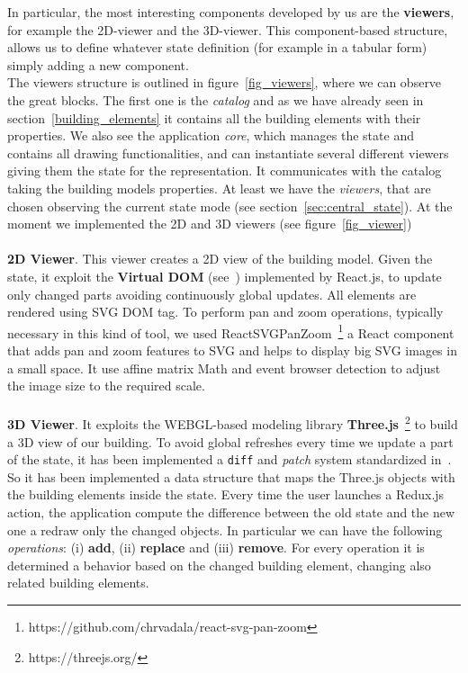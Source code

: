 In particular, the most interesting components developed by us are the \textbf{viewers}, for example the 2D-viewer and the 3D-viewer. This component-based structure, allows us to define whatever state definition (for example in a tabular form) simply adding a new component.\\

The viewers structure is outlined in figure~\ref{fig_viewers}, where we can observe the great blocks. The first one is the \textit{catalog} and as we have already seen in section~\ref{building_elements} it contains all the building elements with their properties. We also see the application \textit{core}, which manages the state and contains all drawing functionalities, and can instantiate several different viewers giving them the state for the representation. It communicates with the catalog taking the building models properties. At least we have the \textit{viewers}, that are chosen observing the current state mode (see section~\ref{sec:central_state}). At the moment we implemented the 2D and 3D viewers (see figure~\ref{fig_viewer})\\\\
\textbf{2D Viewer}. This viewer creates a 2D view of the building model. Given the state, it exploit the \textbf{Virtual DOM} (see~\cite{vdom}) implemented by React.js, to update only changed parts avoiding continuously global updates. All elements are rendered using SVG DOM tag. To perform pan and zoom operations, typically necessary in this kind of tool, we used ReactSVGPanZoom~\footnote{https://github.com/chrvadala/react-svg-pan-zoom} a React component that adds pan and zoom features to SVG and helps to display big SVG images in a small space. It use affine matrix Math and event browser detection to adjust the image size to the required scale.\\\\
\textbf{3D Viewer}. It exploits the WEBGL-based modeling library \textbf{Three.js}~\footnote{https://threejs.org/} to build a 3D view of our building. To avoid global refreshes every time we update a part of the state, it has been implemented a \texttt{diff} and \textit{patch} system standardized in~\cite{rfc6902}. So it has been implemented a data structure that maps the Three.js objects with the building elements inside the state. Every time the user launches a Redux.js action, the application compute the difference between the old state and the new one a redraw only the changed objects. In particular we can have the following \textit{operations}: (i) \textbf{add}, (ii) \textbf{replace} and (iii) \textbf{remove}. For every operation it is determined a behavior based on the changed building element, changing also related building elements.

